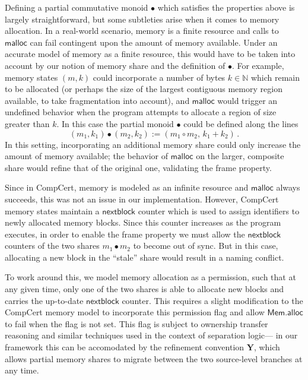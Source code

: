\documentclass[acmsmall,nonacm]{acmart}
\newcommand{\kw}[1]{\ensuremath{ \mathsf{#1} }}
\begin{document}
\begin{remark} %
Defining a partial commutative monoid $\bullet$
which satisfies the properties above
is largely straightforward,
but some subtleties arise when it comes to memory allocation.
In a real-world scenario,
memory is a finite resource and calls to $\kw{malloc}$ can fail
contingent upon the amount of memory available.
Under an accurate model of memory as a finite resource,
this would have to be taken into account by our notion of memory share
and the definition of $\bullet$.
For example,
memory states $(m, k)$ could incorporate a number of bytes $k \in \mathbb{N}$
which remain to be allocated
(or perhaps the size of the largest contiguous memory region available,
to take fragmentation into account),
and $\kw{malloc}$ would trigger an undefined behavior
when the program attempts to allocate a region of size greater than $k$.
In this case the partial monoid $\bullet$
could be defined along the lines
\[
  (m_1, k_1) \bullet (m_2, k_2) :=
  (m_1 \circ m_2, \, k_1 + k_2)
  \,.
\]
In this setting,
incorporating an additional memory share
could only increase the amount of memory available;
the behavior of $\kw{malloc}$ on the larger, composite share
would refine that of the original one,
validating the frame property.

Since in CompCert,
memory is modeled as an infinite resource
and $\kw{malloc}$ always succeeds,
this was not an issue in our implementation.
However,
CompCert memory states maintain a $\kw{nextblock}$
counter which is used to assign identifiers
to newly allocated memory blocks.
Since this counter increases as the program executes,
in order to enable the frame property
we must allow the $\kw{nextblock}$ counters of the two shares
$m_1 \bullet m_2$ to become out of sync.
But in this case, allocating a new block in the ``stale'' share
would result in a naming conflict.

To work around this,
we model memory allocation as a permission,
such that at any given time, only one of the two shares
is able to allocate new blocks
and carries the up-to-date $\kw{nextblock}$ counter.
This requires a slight modification to the CompCert memory model
to incorporate this permission flag and allow $\kw{Mem.alloc}$ to fail
when the flag is not set.
This flag is subject to
ownership transfer reasoning
and similar techniques used in the context of separation logic---%
in our framework this can be accomodated by the
refinement convention $\mathbf{Y}$,
which allows partial memory shares to migrate between the two
source-level branches at any time.
\end{remark}
\end{document}
